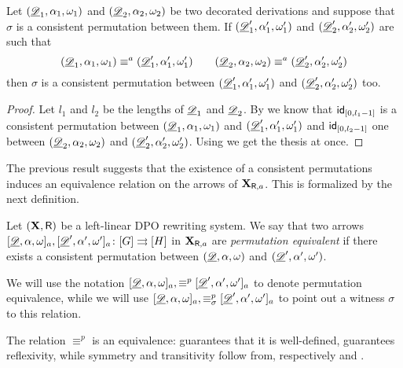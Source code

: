 \begin{corollary}\label{prop:abs}
Let $(\underline{\mathscr{D}}_1, \alpha_1, \omega_1)$ and $(\underline{\mathscr{D}}_2, \alpha_2, \omega_2)$ be two decorated derivations and suppose that $\sigma$ is a consistent permutation between them. If  $(\underline{\mathscr{D}}'_1, \alpha'_1, \omega'_1)$ and $(\underline{\mathscr{D}}'_2, \alpha'_2, \omega'_2)$ are such that
\[ (\underline{\mathscr{D}}_1, \alpha_1, \omega_1)\equiv^a (\underline{\mathscr{D}}'_1, \alpha'_1, \omega'_1) \qquad (\underline{\mathscr{D}}_2, \alpha_2, \omega_2)\equiv^a (\underline{\mathscr{D}}'_2, \alpha'_2, \omega'_2) \] 
then $\sigma$ is a consistent permutation between $(\underline{\mathscr{D}}'_1, \alpha'_1, \omega'_1)$ and $(\underline{\mathscr{D}}'_2, \alpha'_2, \omega'_2)$ too.
\end{corollary}

\begin{proof} Let $l_1$ and $l_2$ be the lengths of $\underline{\mathscr{D}}_1$ and $\underline{\mathscr{D}}_2$. By  we know that  $\mathsf{id}_{[0, l_1-1]}$ is a consistent permutation between  $(\underline{\mathscr{D}}_1, \alpha_1, \omega_1)$ and $(\underline{\mathscr{D}}'_1, \alpha'_1, \omega'_1)$  and $\mathsf{id}_{[0, l_2-1]}$ one between   $(\underline{\mathscr{D}}_2, \alpha_2, \omega_2)$  and $(\underline{\mathscr{D}}'_2, \alpha'_2, \omega'_2)$. Using  we get the thesis at once.
\end{proof}

The previous result suggests that the existence of a consistent permutations induces an equivalence relation on the arrows of $\textbf {\textup{X}}_{\mathsf{R}, a}$. This is formalized by the next definition.

\begin{definition}Let $(\textbf {\textup{X}}, \mathsf{R})$ be a left-linear DPO rewriting system. We say that two arrows
	$[\underline{\mathscr{D}}, \alpha, \omega]_a, [\underline{\mathscr{D}}', \alpha', \omega']_a\colon [G]\rightrightarrows [H]$ in $\textbf {\textup{X}}_{\mathsf{R}, a}$ are \emph{permutation equivalent} if there exists a consistent permutation between $(\underline{\mathscr{D}}, \alpha, \omega)$  and $(\underline{\mathscr{D}}', \alpha', \omega')$. 
	
	We will use the notation $[\underline{\mathscr{D}}, \alpha, \omega]_a, \equiv^p [\underline{\mathscr{D}}', \alpha', \omega']_a$  to denote permutation equivalence, while we will use $[\underline{\mathscr{D}}, \alpha, \omega]_a, \equiv_\sigma^p [\underline{\mathscr{D}}', \alpha', \omega']_a$ to point out a witness $\sigma$ to this relation.
\end{definition}

\begin{remark}
	The relation $\equiv^p$ is an equivalence:  guarantees that it is well-defined,  guarantees reflexivity, while symmetry and transitivity follow from, respectively  and .
\end{remark}

